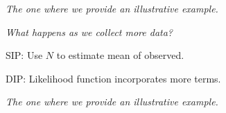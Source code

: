 \begin{frame}{\it The one where we provide an illustrative example.}

\centering
\emph{What happens as we collect more data?}
\bigskip

\bigskip
SIP: Use $N$ to estimate mean of observed.

\bigskip
DIP: Likelihood function incorporates more terms.

\end{frame}

\begin{frame}{\it The one where we provide an illustrative example.}

\begin{figure}
\centering
\end{figure}
\end{frame}

